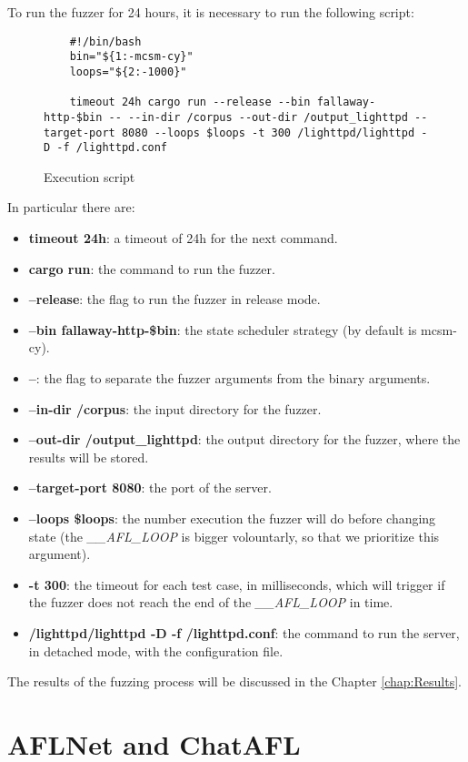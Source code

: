 To run the fuzzer for 24 hours, it is necessary to run the following script:
\begin{figure}[H]
    \begin{lstlisting}
    #!/bin/bash
    bin="${1:-mcsm-cy}"
    loops="${2:-1000}"

    timeout 24h cargo run --release --bin fallaway-http-$bin -- --in-dir /corpus --out-dir /output_lighttpd --target-port 8080 --loops $loops -t 300 /lighttpd/lighttpd -D -f /lighttpd.conf
    \end{lstlisting}
    \caption{Execution script}
    \label{fig:exec_script_fallaway}
\end{figure}
In particular there are:
\begin{itemize}
    \item \textbf{timeout 24h}: a timeout of 24h for the next command.
    \item \textbf{cargo run}: the command to run the fuzzer.
    \item \textbf{--release}: the flag to run the fuzzer in release mode.
    \item \textbf{--bin fallaway-http-\$bin}: the state scheduler strategy (by default is mcsm-cy).
    \item \textbf{--}: the flag to separate the fuzzer arguments from the binary arguments.
    \item \textbf{--in-dir /corpus}: the input directory for the fuzzer.
    \item \textbf{--out-dir /output\_lighttpd}: the output directory for the fuzzer, where the results will be stored.
    \item \textbf{--target-port 8080}: the port of the server.
    \item \textbf{--loops \$loops}: the number execution the fuzzer will do before changing state (the \textit{\_\_AFL\_LOOP} is bigger volountarly, so that we prioritize this argument).
    \item \textbf{-t 300}: the timeout for each test case, in milliseconds, which will trigger if the fuzzer does not reach the end of the \textit{\_\_AFL\_LOOP} in time.
    \item \textbf{/lighttpd/lighttpd -D -f /lighttpd.conf}: the command to run the server, in detached mode, with the configuration file.
\end{itemize}
The results of the fuzzing process will be discussed in the Chapter \ref{chap:Results}.

\section{AFLNet and ChatAFL}

